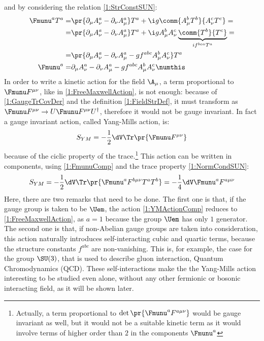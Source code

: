 and by considering the relation \eqref{1:StrConstSUN}:
\begin{align*}
    \Fmunu^aT^a =& \pr{\partial_\mu A_\nu^a-\partial_\nu A_\mu^a}T^a +\i g\comm{A_\mu^bT^b}{A_\nu^cT^c}= \\
    =& \pr{\partial_\mu A_\nu^a-\partial_\nu A_\mu^a}T^a +\i gA_\mu^bA_\nu^c\underbrace{\comm{T^b}{T^c}}_{if^{bca}T^a}= \\
    =& \pr{\partial_\mu A_\nu^a-\partial_\nu A_\mu^a -gf^{abc}A_\mu^bA_\nu^c}T^a \\
    \Fmunu^a =& \partial_\mu A_\nu^a-\partial_\nu A_\mu^a -gf^{abc}A_\mu^bA_\nu^c \numthis\label{1:FmunuExplComp}
\end{align*}
In order to write a kinetic action for the field $\A_\mu$, a term proportional to $\Fmunu F^{\mu\nu}$, like in \eqref{1:FreeMaxwellAction}, is not enough:
because of \eqref{1:GaugeTrCovDer} and the definition \eqref{1:FieldStrDef}, it must transform as $\Fmunu F^{\mu\nu}\rightarrow U\Fmunu F^{\mu\nu} U^\dagger$, therefore it would not be gauge invariant.
In fact a gauge invariant action, called Yang-Mills action, is:
\begin{equation}
    S_{YM} = -\frac12\dV\Tr\pr{\Fmunu F^{\mu\nu}} \label{1:YMAction}
\end{equation}
because of the ciclic property of the trace.\footnote{Actually, a term proportional to $\det\pr{\Fmunu^a F^{a\mu\nu}}$ would be gauge invariant as well, but it would not be a suitable kinetic term as it would involve terms of higher order than $2$ in the components $\Fmunu^a$}
This action can be written in components, using \eqref{1:FmunuComp} and the trace property \eqref{1:NormCondSUN}:
\begin{equation}
    S_{YM} = -\frac12\dV\Tr\pr{\Fmunu^a F^{b\mu\nu}T^aT^b} = -\frac14\dV\Fmunu^a F^{a\mu\nu} \label{1:YMActionComp}
\end{equation}
Here, there are two remarks that need to be done.
The first one is that, if the gauge group is taken to be $\Uem$, the action \eqref{1:YMActionComp} reduces to \eqref{1:FreeMaxwellAction}, as $a=1$ because the group $\Uem$ has only $1$ generator.
The second one is that, if non-Abelian gauge groups are taken into consideration, this action naturally introduces self-interacting cubic and quartic terms, because the structure constants $f^{abc}$ are non-vanishing. This is, for example, the case for the group $\SU(3)$, that is used to describe gluon interaction, \ie Quantum Chromodynamics (QCD).
These self-interactions make the the Yang-Mills action interesting to be studied even alone, without any other fermionic or bosonic interacting field, as it will be shown later.
